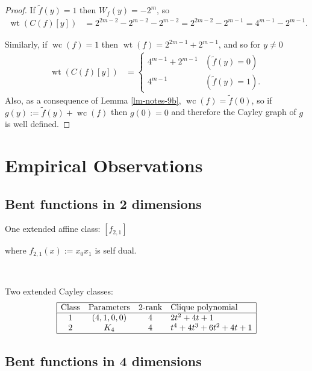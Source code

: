 \documentclass[12pt,a4paper]{article}
\newcommand{\dual}[1]{\widetilde{#1}}
\newcommand{\weight}[1]{\operatorname{wt}\left(#1\right)}
\newcommand{\weightclass}[1]{\operatorname{wc}\left(#1\right)}
\begin{document}
\begin{proof}
If $\dual{f}(y) = 1$ then $W_f(y) = -2^m$, so
\begin{align*}
\weight{C(f)[y]}
&=
2^{2m-2}-2^{m-2} - 2^{m-2}
=
2^{2m-2} - 2^{m-1}
=
4^{m-1} - 2^{m-1}.
\end{align*}

Similarly, if $\weightclass{f} = 1$ then $\weight{f} = 2^{2m-1}+2^{m-1}$,
and so for $y \neq 0$
\begin{align*}
\weight{C(f)[y]}
&=
\begin{cases}
4^{m-1} + 2^{m-1} & (\dual{f}(y)=0)
\\
4^{m-1}           & (\dual{f}(y)=1).
\end{cases}
\end{align*}
Also, as a consequence of Lemma \ref{lm-notes-9b}, $\weightclass{f} = \dual{f}(0)$,
so if $g(y) := \dual{f}(y) + \weightclass{f}$ then $g(0)=0$ and therefore the Cayley graph of $g$
is well defined.
\end{proof}


\section{Empirical Observations}
\label{sec-Empirical}
\subsection{Bent functions in 2 dimensions}

One extended affine class: $[f_{2,1}]$

where $f_{2,1}(x) := x_0 x_1$ is self dual.

~

Two extended Cayley classes:
\begin{align*}
\begin{array}{|cccl|}
\hline
\text{Class} &
\text{Parameters} &
\text{2-rank} &
\text{Clique polynomial}
\\
\hline
1 &
(4, 1, 0, 0) & 4 &
2t^{2} + 4t + 1
\\
2 &
K_4 & 4 &
t^{4} + 4t^{3} + 6t^{2} + 4t + 1
\\
\hline
\end{array}
\end{align*}

\subsection{Bent functions in 4 dimensions}
\end{document}
